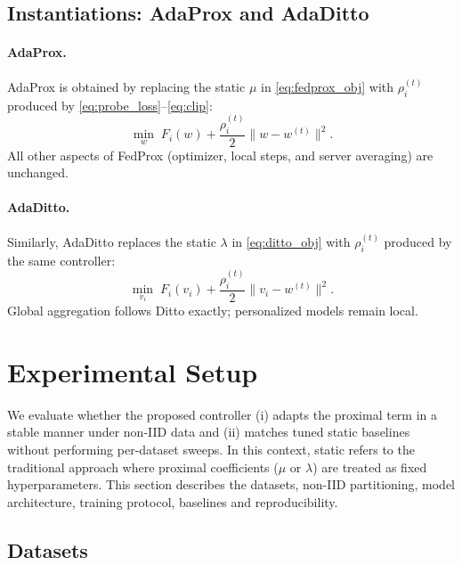 \documentclass[letterpaper]{article} %
\begin{document}
\subsection{Instantiations: AdaProx and AdaDitto}

\paragraph{AdaProx.}
AdaProx is obtained by replacing the static $\mu$ in \eqref{eq:fedprox_obj} with $\rho_i^{(t)}$ produced by \eqref{eq:probe_loss}--\eqref{eq:clip}:
\begin{equation}
\min_{w}\; F_i(w) + \frac{\rho_i^{(t)}}{2}\|w-w^{(t)}\|^2.
\end{equation}
All other aspects of FedProx (optimizer, local steps, and server averaging) are unchanged.

\paragraph{AdaDitto.}
Similarly, AdaDitto replaces the static $\lambda$ in \eqref{eq:ditto_obj} with $\rho_i^{(t)}$ produced by the same controller:
\begin{equation}
\min_{v_i}\; F_i(v_i) + \frac{\rho_i^{(t)}}{2}\|v_i-w^{(t)}\|^2.
\end{equation}
Global aggregation follows Ditto exactly; personalized models remain local.



\section{Experimental Setup}
\label{sec:experimental}
We evaluate whether the proposed controller (i) adapts the proximal
term in a stable manner under non-IID data and (ii) matches tuned
static baselines without performing per-dataset sweeps. In this
context, static refers to the traditional approach where proximal
coefficients ($\mu$ or $\lambda$) are treated as fixed
hyperparameters. This section describes the datasets, non-IID
partitioning, model architecture, training protocol, baselines and
reproducibility.

\subsection{Datasets}
\end{document}
